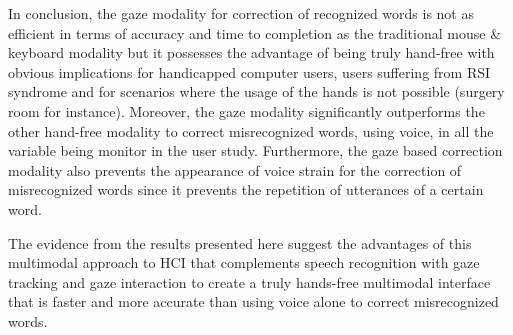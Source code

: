 \documentclass[]{article}
\begin{document}
In conclusion, the gaze modality for correction of recognized words is not as efficient in terms of accuracy and time to
completion as the traditional mouse \& keyboard modality but it possesses the advantage of being truly hand-free with
obvious  implications for handicapped computer users, users suffering from RSI syndrome and for scenarios where the
usage of the hands is not possible (surgery room for instance). Moreover, the gaze modality significantly outperforms
the other hand-free modality to correct misrecognized words, using voice, in all the variable being monitor in the user
study. Furthermore, the gaze based correction modality also prevents the appearance of voice strain for the correction
of misrecognized words since it prevents the  repetition of utterances of a certain word.

The evidence from the results presented here suggest the advantages of this multimodal approach to HCI that complements
speech recognition with gaze tracking and gaze interaction to create a truly hands-free multimodal interface that is
faster and more accurate than using voice alone to correct misrecognized words.




\end{document}
